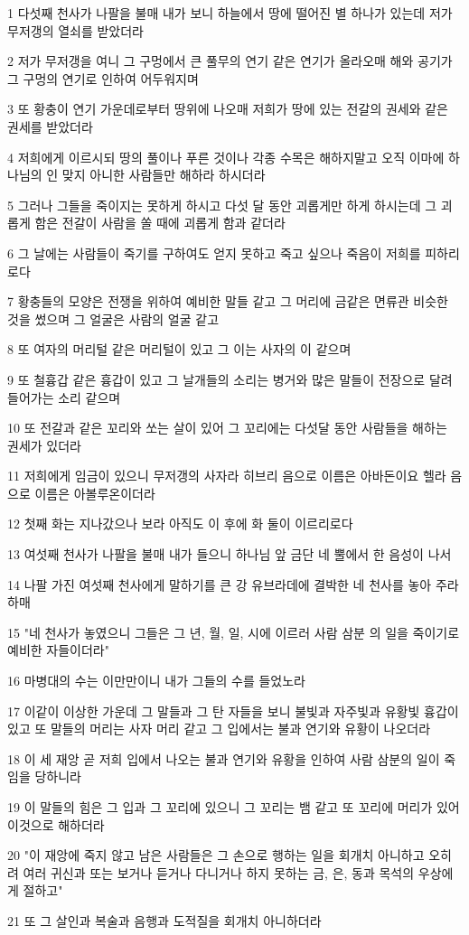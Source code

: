 \par 1 다섯째 천사가 나팔을 불매 내가 보니 하늘에서 땅에 떨어진 별 하나가 있는데 저가 무저갱의 열쇠를 받았더라
\par 2 저가 무저갱을 여니 그 구멍에서 큰 풀무의 연기 같은 연기가 올라오매 해와 공기가 그 구멍의 연기로 인하여 어두워지며
\par 3 또 황충이 연기 가운데로부터 땅위에 나오매 저희가 땅에 있는 전갈의 권세와 같은 권세를 받았더라
\par 4 저희에게 이르시되 땅의 풀이나 푸른 것이나 각종 수목은 해하지말고 오직 이마에 하나님의 인 맞지 아니한 사람들만 해하라 하시더라
\par 5 그러나 그들을 죽이지는 못하게 하시고 다섯 달 동안 괴롭게만 하게 하시는데 그 괴롭게 함은 전갈이 사람을 쏠 때에 괴롭게 함과 같더라
\par 6 그 날에는 사람들이 죽기를 구하여도 얻지 못하고 죽고 싶으나 죽음이 저희를 피하리로다
\par 7 황충들의 모양은 전쟁을 위하여 예비한 말들 같고 그 머리에 금같은 면류관 비슷한 것을 썼으며 그 얼굴은 사람의 얼굴 같고
\par 8 또 여자의 머리털 같은 머리털이 있고 그 이는 사자의 이 같으며
\par 9 또 철흉갑 같은 흉갑이 있고 그 날개들의 소리는 병거와 많은 말들이 전장으로 달려 들어가는 소리 같으며
\par 10 또 전갈과 같은 꼬리와 쏘는 살이 있어 그 꼬리에는 다섯달 동안 사람들을 해하는 권세가 있더라
\par 11 저희에게 임금이 있으니 무저갱의 사자라 히브리 음으로 이름은 아바돈이요 헬라 음으로 이름은 아볼루온이더라
\par 12 첫째 화는 지나갔으나 보라 아직도 이 후에 화 둘이 이르리로다
\par 13 여섯째 천사가 나팔을 불매 내가 들으니 하나님 앞 금단 네 뿔에서 한 음성이 나서
\par 14 나팔 가진 여섯째 천사에게 말하기를 큰 강 유브라데에 결박한 네 천사를 놓아 주라 하매
\par 15 "네 천사가 놓였으니 그들은 그 년, 월, 일, 시에 이르러 사람 삼분 의 일을 죽이기로 예비한 자들이더라"
\par 16 마병대의 수는 이만만이니 내가 그들의 수를 들었노라
\par 17 이같이 이상한 가운데 그 말들과 그 탄 자들을 보니 불빛과 자주빛과 유황빛 흉갑이 있고 또 말들의 머리는 사자 머리 같고 그 입에서는 불과 연기와 유황이 나오더라
\par 18 이 세 재앙 곧 저희 입에서 나오는 불과 연기와 유황을 인하여 사람 삼분의 일이 죽임을 당하니라
\par 19 이 말들의 힘은 그 입과 그 꼬리에 있으니 그 꼬리는 뱀 같고 또 꼬리에 머리가 있어 이것으로 해하더라
\par 20 "이 재앙에 죽지 않고 남은 사람들은 그 손으로 행하는 일을 회개치 아니하고 오히려 여러 귀신과 또는 보거나 듣거나 다니거나 하지 못하는 금, 은, 동과 목석의 우상에게 절하고"
\par 21 또 그 살인과 복술과 음행과 도적질을 회개치 아니하더라

